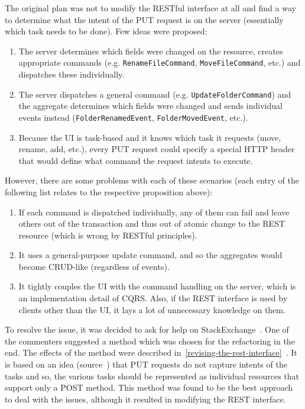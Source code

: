 \documentclass{book}
\begin{document}
The original plan was not to modify the RESTful interface at all and
find a way to determine what the intent of the PUT request is on the
server (essentially which task needs to be done). Few ideas were
proposed:

\begin{enumerate}
\def\labelenumi{\arabic{enumi}.}
\tightlist
\item
  The server determines which fields were changed on the resource,
  creates appropriate commands (e.g. \texttt{RenameFileCommand},
  \texttt{MoveFileCommand}, etc.) and dispatches these individually.
\item
  The server dispatches a general command (e.g.
  \texttt{UpdateFolderCommand}) and the aggregate determines which
  fields were changed and sends individual events instead
  (\texttt{FolderRenamedEvent}, \texttt{FolderMovedEvent}, etc.).
\item
  Because the UI is task-based and it knows which task it requests
  (move, rename, add, etc.), every PUT request could specify a special
  HTTP header that would define what command the request intents to execute.
\end{enumerate}

However, there are some problems with each of these scenarios (each
entry of the following list relates to the respective proposition
above):

\begin{enumerate}
\def\labelenumi{\arabic{enumi}.}
\tightlist
\item
  If each command is dispatched individually, any of them can fail
  and leave others out of the transaction and thus out of atomic change to the
  REST resource (which is wrong by RESTful principles).
\item
  It uses a general-purpose update command, and so the aggregates would
  become CRUD-like (regardless of events).
\item
  It tightly couples the UI with the command handling on the server,
  which is an implementation detail of CQRS. Also, if the REST interface
  is used by clients other than the UI, it lays a lot of unnecessary
  knowledge on them.
\end{enumerate}

To resolve the issue, it was decided to ask for help on StackExchange~\cite{stackexchange}. One of the commenters suggested a method which was
chosen for the refactoring in the end. The effects of the method were
described
in~\ref{revising-the-rest-interface}~.
It is based on an idea (source~\cite{putless-rest}) that PUT requests do
not capture intents of the tasks and so, the various tasks should be
represented as individual resources that support only a POST method.
This method was found to be the best approach to deal with the issues, although
it resulted in modifying the REST interface.
\end{document}
